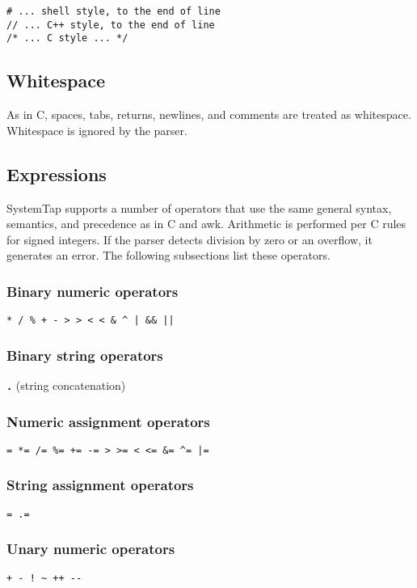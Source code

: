 \documentclass[twoside,english]{article}
\newenvironment{vindent}
{\begin{list}{}{\setlength{\listparindent}{6pt}}
\item[]}
{\end{list}}
\begin{document}
\begin{vindent}
\begin{verbatim}
# ... shell style, to the end of line
// ... C++ style, to the end of line
/* ... C style ... */
\end{verbatim}
\end{vindent}

\subsection{Whitespace}
As in C, spaces, tabs, returns, newlines, and comments are treated as whitespace.
Whitespace is ignored by the parser.


\subsection{Expressions}
SystemTap supports a number of operators that use the same general syntax,
semantics, and precedence as in C and awk. Arithmetic is performed per C
rules for signed integers. If the parser detects division by zero or an overflow,
it generates an error. The following subsections list these operators.

\subsubsection{Binary numeric operators}
\texttt{{*} / \% + - >\,{}> <\,{}< \& \textasciicircum{}
| \&\& ||}

\subsubsection{Binary string operators}
\texttt{\textbf{.}} (string concatenation)

\subsubsection{Numeric assignment operators}
\texttt{= {*}= /= \%= += -= >\,{}>= <\,{}<=
\&= \textasciicircum{}= |=}

\subsubsection{String assignment operators}

\texttt{= .=}

\subsubsection{Unary numeric operators}
\texttt{+ - ! \textasciitilde{} ++ -{}-}
\end{document}
